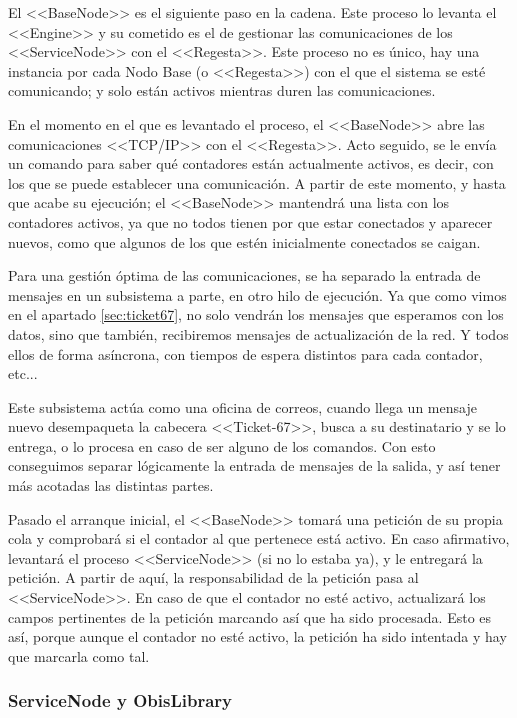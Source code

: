 El <<BaseNode>> es el siguiente paso en la cadena. Este proceso lo levanta el <<Engine>> y su cometido es el de gestionar las comunicaciones de los <<ServiceNode>> con el <<Regesta>>. Este proceso no es único, hay una instancia por cada Nodo Base (o <<Regesta>>) con el que el sistema se esté comunicando; y solo están activos mientras duren las comunicaciones. 

En el momento en el que  es levantado el proceso, el <<BaseNode>> abre las comunicaciones <<TCP/IP>> con el <<Regesta>>. Acto seguido, se le envía un comando para saber qué contadores están actualmente activos, es decir, con los que se puede establecer una comunicación. A partir de este momento, y hasta que acabe su ejecución; el <<BaseNode>> mantendrá una lista con los contadores activos, ya que no todos tienen por que estar conectados y aparecer nuevos, como que algunos de los que estén inicialmente conectados se caigan.

Para una gestión óptima de las comunicaciones, se ha separado la entrada de mensajes en un subsistema a parte, en otro hilo de ejecución. Ya que como vimos en el apartado \ref{sec:ticket67}, no solo vendrán los mensajes que esperamos con los datos, sino que también, recibiremos mensajes de actualización de la red. Y todos ellos de forma asíncrona, con tiempos de espera distintos para cada contador, etc...

Este subsistema actúa como una oficina de correos, cuando llega un mensaje nuevo desempaqueta la cabecera <<Ticket-67>>, busca a su destinatario y se lo entrega, o lo procesa en caso de ser alguno de los comandos. Con esto conseguimos separar lógicamente la entrada de mensajes de la salida, y así tener más acotadas las distintas partes.

Pasado el arranque inicial, el <<BaseNode>> tomará una petición de su propia cola y comprobará si el contador al que pertenece está activo. En caso afirmativo, levantará el proceso <<ServiceNode>> (si no lo estaba ya), y le entregará la petición. A partir de aquí, la responsabilidad de la petición pasa al <<ServiceNode>>. En caso de que el contador no esté activo, actualizará los campos pertinentes de la petición marcando así que ha sido procesada. Esto es así, porque aunque el contador no esté activo, la petición ha sido intentada y hay que marcarla como tal.

\subsubsection{ServiceNode y ObisLibrary}

